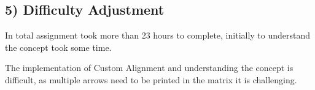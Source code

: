 \documentclass[
]{article}
\begin{document}
\hypertarget{difficulty-adjustment}{%
\subsection{\texorpdfstring{\textbf{5) Difficulty
Adjustment}}{5) Difficulty Adjustment}}\label{difficulty-adjustment}}

In total assignment took more than 23 hours to complete, initially to
understand the concept took some time.

The implementation of Custom Alignment and understanding the concept is
difficult, as multiple arrows need to be printed in the matrix it is
challenging.
\end{document}
